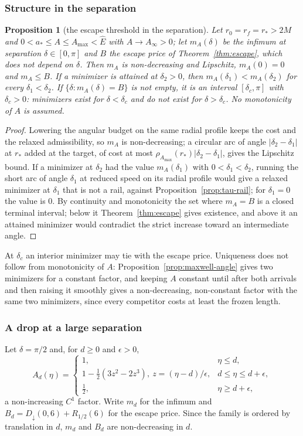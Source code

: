 \documentclass[aip,jmp,amsmath,amssymb,reprint]{revtex4-2}
\newcommand{\Ehat}{\hat E}
\theoremstyle{plain}
\newtheorem{proposition}{Proposition}[section]
\theoremstyle{definition}
\begin{document}
\subsubsection*{Structure in the separation}
\begin{proposition}[the escape threshold in the separation]\label{prop:tau-var-delta}
Let $r_0=r_f=r_*>2M$ and $0<a_*\le A\le A_{\max}<\Ehat$ with $A\to A_\infty>0$; let $m_A(\delta)$ be the infimum
at separation $\delta\in[0,\pi]$ and $B$ the escape price of Theorem~\ref{thm:escape}, which does not depend on
$\delta$. Then $m_A$ is non-decreasing and Lipschitz, $m_A(0)=0$ and $m_A\le B$. If a minimizer is attained
at $\delta_2>0$, then $m_A(\delta_1)<m_A(\delta_2)$ for every $\delta_1<\delta_2$. If $\{\delta:m_A(\delta)=B\}$ is not empty,
it is an interval $[\delta_c,\pi]$ with $\delta_c>0$: minimizers exist for $\delta<\delta_c$ and do not exist for
$\delta>\delta_c$. No monotonicity of $A$ is assumed.
\end{proposition}

\begin{proof}
Lowering the angular budget on the same radial profile keeps the cost and the relaxed
admissibility, so $m_A$ is non-decreasing; a circular arc of angle $|\delta_2-\delta_1|$ at $r_*$ added at the
target, of cost at most $\rho_{A_{\max}}(r_*)|\delta_2-\delta_1|$, gives the Lipschitz bound. If a minimizer at
$\delta_2$ had the value $m_A(\delta_1)$ with $0<\delta_1<\delta_2$, running the short arc of angle $\delta_1$ at reduced
speed on its radial profile would give a relaxed minimizer at $\delta_1$ that is not a rail, against
Proposition~\ref{prop:tau-rail}; for $\delta_1=0$ the value is $0$. By continuity and monotonicity the set
where $m_A=B$ is a closed terminal interval; below it Theorem~\ref{thm:escape} gives existence, and above
it an attained minimizer would contradict the strict increase toward an intermediate angle.
\end{proof}

At $\delta_c$ an interior minimizer may tie with the escape price. Uniqueness does not follow from
monotonicity of $A$: Proposition~\ref{prop:maxwell-angle} gives two minimizers for a constant
factor, and keeping $A$ constant until after both arrivals and then raising it smoothly gives a
non-decreasing, non-constant factor with the same two minimizers, since every competitor costs at
least the frozen length.

\subsubsection*{A drop at a large separation}
Let $\delta=\pi/2$ and, for $d\ge0$ and $\epsilon>0$,
\[
  A_{d}(\eta)=\begin{cases}1,&\eta\le d,\\ 1-\frac12(3z^2-2z^3),\ z=(\eta-d)/\epsilon,&d\le\eta\le d+\epsilon,\\
  \frac12,&\eta\ge d+\epsilon,\end{cases}
\]
a non-increasing $C^1$ factor. Write $m_d$ for the infimum and $B_d=D_\downarrow(0,6)+R_{1/2}(6)$ for the escape
price. Since the family is ordered by translation in $d$, $m_d$ and $B_d$ are non-decreasing in $d$.
\end{document}

